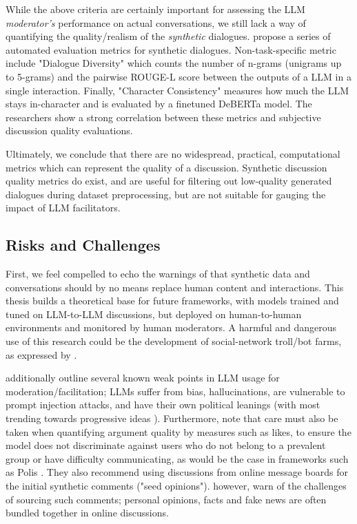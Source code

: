 While the above criteria are certainly important for assessing the LLM \textit{moderator's} performance on actual conversations, we still lack a way of quantifying the quality/realism of the \textit{synthetic} dialogues. \citet{ulmer2024bootstrappingllmbasedtaskorienteddialogue} propose a series of automated evaluation metrics for synthetic dialogues. Non-task-specific metric include "Dialogue Diversity" which counts the number of n-grams (unigrams up to 5-grams) and the pairwise ROUGE-L \cite{lin-2004-rouge} score between the outputs of a LLM in a single interaction. Finally, "Character Consistency" measures how much the LLM stays in-character and is evaluated by a finetuned DeBERTa \cite{he2023debertav3improvingdebertausing} model. The researchers show a strong correlation between these metrics and subjective discussion quality evaluations. 

Ultimately, we conclude that there are no widespread, practical, computational metrics which can represent the quality of a discussion. Synthetic discussion quality metrics do exist, and are useful for filtering out low-quality generated dialogues during dataset preprocessing, but are not suitable for gauging the impact of LLM facilitators.


\subsection{Risks and Challenges}
\label{sec:related:challenges}

First, we feel compelled to echo the warnings of \citet{small-polis-llm} that synthetic data and conversations should by no means replace human content and interactions. This thesis builds a theoretical base for future frameworks, with models trained and tuned on LLM-to-LLM discussions, but deployed on human-to-human environments and monitored by human moderators. A harmful and dangerous use of this research could be the development of social-network troll/bot farms, as expressed by \citet{park2022socialsimulacracreatingpopulated}.

\citet{small-polis-llm} additionally outline several known weak points in LLM usage for moderation/facilitation; LLMs suffer from bias, hallucinations, are vulnerable to prompt injection attacks, and have their own political leanings (with most trending towards progressive ideas \cite{Taubenfeld2024SystematicBI}). Furthermore, \citet{vecchi-2021-towards} note that care must also be taken when quantifying argument quality by measures such as likes, to ensure the model does not discriminate against users who do not belong to a prevalent group or have difficulty communicating, as would be the case in frameworks such as Polis \cite{small2021polis}. They also recommend using discussions from online message boards for the initial synthetic comments ("seed opinions"). \citet{vecchi-2021-towards} however, warn of the challenges of sourcing such comments; personal opinions, facts and fake news are often bundled together in online discussions.

